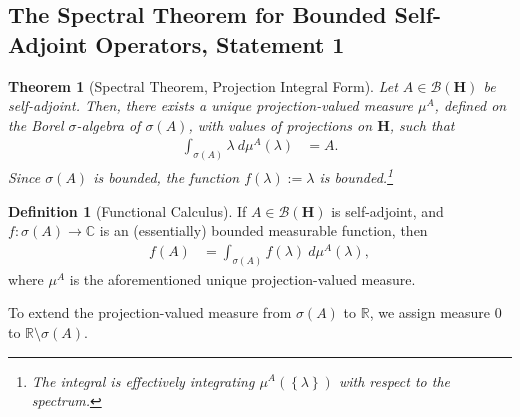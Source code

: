 \documentclass[12pt]{extarticle}
\newcommand{\R}{\mathbb{R}}
\newcommand{\C}{\mathbb{C}}
\newcommand{\set}[1]{\left\{#1\right\}}
\theoremstyle{plain}
\newtheorem*{theorem}{Theorem}%
\theoremstyle{definition}
\newtheorem*{definition}{Definition}
\theoremstyle{remark}
\renewcommand{\newline}{\hfill\break}
\begin{document}
  \subsection{The Spectral Theorem for Bounded Self-Adjoint Operators, Statement 1}%
  \begin{theorem}[Spectral Theorem, Projection Integral Form]
    Let $A\in \mathcal{B}\left(\mathbf{H}\right)$ be self-adjoint. Then, there exists a unique projection-valued measure $\mu^{A}$, defined on the Borel $\sigma$-algebra of $\sigma(A)$, with values of projections on $\mathbf{H}$, such that
    \begin{align*}
      \int_{\sigma(A)}^{} \lambda\:d\mu^{A}(\lambda) &= A.
    \end{align*}
    Since $\sigma(A)$ is bounded, the function $f(\lambda) := \lambda$ is bounded.\footnote{The integral is effectively integrating $\mu^{A}\left(\set{\lambda}\right)$ with respect to the spectrum.}
  \end{theorem}
  \begin{definition}[Functional Calculus]
    If $A\in \mathcal{B}\left(\mathbf{H}\right)$ is self-adjoint, and $f: \sigma(A)\rightarrow \C$ is an (essentially) bounded measurable function, then
    \begin{align*}
      f(A) &= \int_{\sigma(A)}^{} f(\lambda)\:d\mu^{A}(\lambda),
    \end{align*}
    where $\mu^{A}$ is the aforementioned unique projection-valued measure.
  \end{definition}
  To extend the projection-valued measure from $\sigma(A)$ to $\R$, we assign measure $0$ to $\R\setminus \sigma(A)$.\newline
\end{document}
